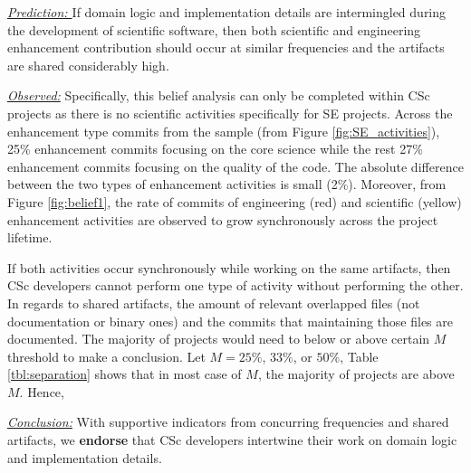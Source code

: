 \documentclass[conference,10pt]{IEEEtran}
\newenvironment{RQ}{\vspace{1mm}\begin{tcolorbox}[enhanced,width=3.4in,size=fbox,colback=red!5!white,drop shadow southeast,sharp corners]}{\end{tcolorbox}}
\begin{document}
\noindent \textit{\underline{Prediction: }} If domain logic and implementation details are intermingled during the development of scientific software, then both scientific and engineering enhancement contribution should occur at similar frequencies and the artifacts are shared considerably high. 



\noindent \textit{\underline{Observed:}} Specifically, this belief analysis can only be completed within CSc projects as there is no scientific activities specifically for SE projects. Across the enhancement type commits from the sample (from Figure \ref{fig:SE_activities}), 25\% enhancement commits focusing on the core science while the rest 27\% enhancement commits focusing on the quality of the code. The absolute difference between the two types of enhancement activities is small (2\%). Moreover, from Figure \ref{fig:belief1}, the rate of commits of engineering (red) and scientific (yellow) enhancement activities are observed to grow synchronously across the project lifetime. 

If both activities occur synchronously while working on the same artifacts, then CSc developers cannot perform one type of activity without performing the other. In regards to shared artifacts, the amount of relevant overlapped files (not documentation or binary ones) and the commits that maintaining those files are documented. The majority of projects would need to below or above certain $M$ threshold to make a conclusion. Let $M = 25\%$, $33\%$, or $50\%$, Table \ref{tbl:separation} shows that in most case of $M$, the majority of projects are above $M$. Hence,  



\begin{RQ}
\textit{\underline{Conclusion:}} With supportive indicators from concurring frequencies and shared artifacts,  
we \textbf{endorse}  that CSc developers intertwine their work
on domain logic and implementation details.
\end{RQ}
\end{document}
